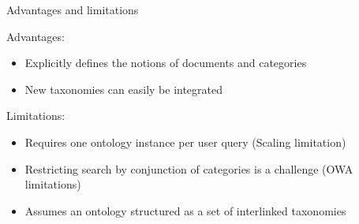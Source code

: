 \begin{frame}{Advantages and limitations}

    Advantages:
    \begin{itemize}
        \item Explicitly defines the notions of documents and categories
        \item New taxonomies can easily be integrated
    \end{itemize}

    Limitations:
    \begin{itemize}
        \item Requires one ontology instance per user query (Scaling limitation)
        \item Restricting search by conjunction of categories is a challenge (OWA limitations)
        \item Assumes an ontology structured as a set of interlinked taxonomies
    \end{itemize}

\end{frame}